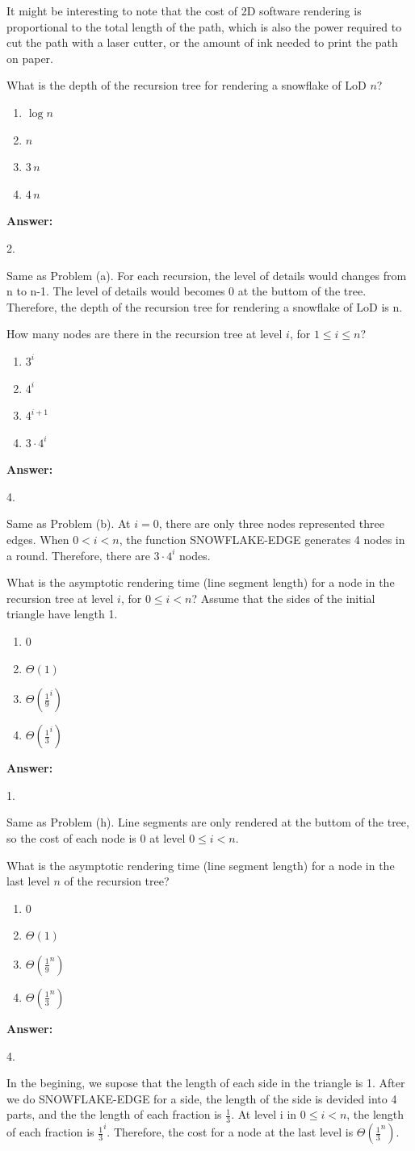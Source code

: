 \documentclass[12pt,twoside]{article}
\newcommand{\answer}{
 \par\medskip
 \textbf{Answer:}
}
\newcommand{\answerIm}{ \answer
{\color{blue}2. 

Same as Problem (a). For each recursion, the level of details would changes from n to n-1.
The level of details would becomes 0 at the buttom of the tree. Therefore, the 
depth of the recursion tree for rendering a snowflake of LoD is n.}
}
\newcommand{\answerIn}{ \answer
{\color{blue}4.

Same as Problem (b). At $i=0$, there are only three nodes represented three edges. When $0 < i < n$, 
the function SNOWFLAKE-EDGE generates 4 nodes in a round. Therefore, there are 
$3 \cdot 4^i$ nodes.}
}
\newcommand{\answerIo}{ \answer
{\color{blue}1.

Same as Problem (h). Line segments are only rendered 
at the buttom of the tree, so the cost of each node is 0 at 
level $0 \le i < n$.}
}
\newcommand{\answerIp}{ \answer
{\color{blue}4.

In the begining, we supose that the length of each side in the triangle 
is 1. After we do SNOWFLAKE-EDGE for a side, the length of the side is 
devided into 4 parts, and the the length of each fraction is $\frac{1}{3}$.
At level i in $0 \le i < n$, the length of each fraction is $\frac{1}{3}^i$.
Therefore, the cost for a node at the last level is $\Theta(\frac{1}{3}^n)$.}
}
\begin{document}
\begin{problems}
It might be interesting to note that the cost of 2D software rendering is
proportional to the total length of the path, which is also the power required
to cut the path with a laser cutter, or the amount of ink needed to print the
path on paper.

\begin{problemparts}
  \problempart {} What is the depth of the recursion tree for rendering a
  snowflake of LoD $n$?
    \begin{enumerate}
      \item $\log n$
      \item $n$
      \item $3 \, n$
      \item $4 \, n$
    \end{enumerate}
\answerIm

  \problempart {} How many nodes are there in the recursion tree at level
  $i$, for $1 \le i \le n$?
    \begin{enumerate}
      \item $3 ^ i$
      \item $4 ^ i$
      \item $4 ^ {i + 1}$
      \item $3 \cdot 4 ^ i$
    \end{enumerate}
\answerIn

  \problempart {} What is the asymptotic rendering time (line segment length)
  for a node in the recursion tree at level $i$, for $0 \le i < n$? Assume that
  the sides of the initial triangle have length 1.
    \begin{enumerate}
      \item $0$
      \item $\Theta(1)$
      \item $\Theta(\frac{1}{9}^i)$
      \item $\Theta(\frac{1}{3}^i)$
    \end{enumerate}
\answerIo

  \problempart {} What is the asymptotic rendering time (line segment length)
  for a node in the last level $n$ of the recursion tree?
    \begin{enumerate}
      \item $0$
      \item $\Theta(1)$
      \item $\Theta(\frac{1}{9}^n)$
      \item $\Theta(\frac{1}{3}^n)$
    \end{enumerate}
\answerIp


\end{problemparts}
\end{problems}
\end{document}
